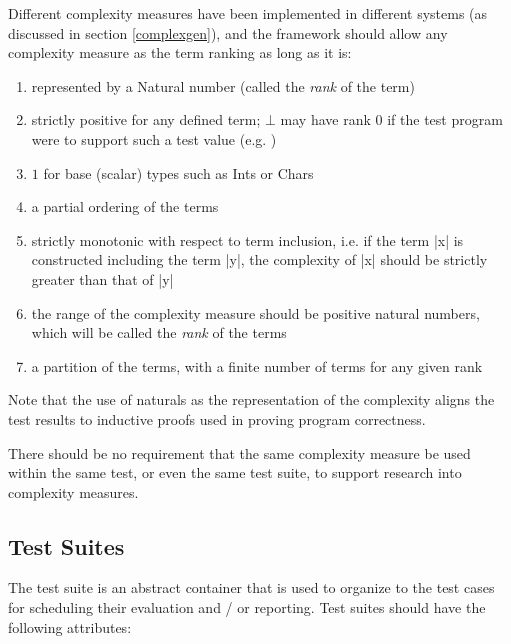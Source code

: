 Different complexity measures have been implemented in different \pbt systems
(as discussed in section \ref{complexgen}),
and the framework should allow any complexity measure as the term ranking
as long as it is:
\begin{enumerate}
    \item represented by a Natural number (called the \emph{rank} of the term)
    \item strictly positive for any defined term; $\bot$ may have rank 0 if the test program were to support such a test value (e.g. \LSC)    
    \item $1$ for base (scalar) types such as Ints or Chars 
    \item a partial ordering of the terms
    \item strictly monotonic with respect to term inclusion,
    i.e. if the term |x| is constructed including the term |y|, the complexity of |x| should be strictly greater than that of |y|
    \item the range of the complexity measure should be positive natural numbers,
    which will be called the \emph{rank} of the terms
    \item a partition of the terms, with a finite number of terms for any given rank
\end{enumerate}
\noindent
Note that the use of naturals as the representation of the complexity aligns
the test results to inductive proofs used in proving program correctness.

There should be no requirement that the same complexity measure be used
within the same test, or even the same test suite,
to support research into complexity measures.

\subsection{Test Suites}

The test suite is an abstract container that is used to
organize to the test cases for 
scheduling their evaluation and / or reporting.
Test suites should have the following attributes:

